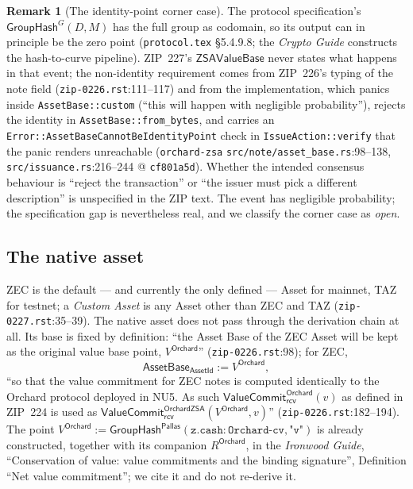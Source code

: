 \documentclass[11pt,a4paper]{article}
\theoremstyle{definition}
\newtheorem{remark}[theorem]{Remark}
\newcommand{\Pallas}{\ensuremath{\mathsf{Pallas}}}
\newcommand{\GroupHash}{\ensuremath{\mathsf{GroupHash}}}
\newcommand{\rcv}{\ensuremath{\mathsf{rcv}}}
\begin{document}
\begin{remark}[The identity-point corner case]\label{rem:zsa-identity-point}
The protocol specification's $\GroupHash^{G}(D, M)$ has the full group as
codomain, so its output can in principle be the zero point
(\texttt{protocol.tex} \S5.4.9.8; the \emph{Crypto Guide} constructs the
hash-to-curve pipeline). ZIP~227's $\mathsf{ZSAValueBase}$ never
states what happens in that event; the non-identity requirement comes from
ZIP~226's typing of the note field
(\texttt{zip-0226.rst}:111--117) and from the implementation, which panics
inside \texttt{AssetBase::custom} (``this will happen with negligible
probability''), rejects the identity in \texttt{AssetBase::from\_bytes},
and carries an \texttt{Error::AssetBaseCannotBeIdentityPoint} check in
\texttt{IssueAction::verify} that the panic renders unreachable
(\texttt{orchard-zsa} \texttt{src/note/\allowbreak asset\_base.rs}:98--138,
\texttt{src/issuance.rs}:216--244 @ \texttt{cf801a5d}). Whether the
intended consensus behaviour is ``reject the transaction'' or ``the issuer
must pick a different description'' is unspecified in the ZIP text. The
event has negligible probability; the specification gap is nevertheless
real, and we classify the corner case as \emph{open}.
\end{remark}

\subsection{The native asset}\label{sec:zsa-native-asset}

ZEC is the default --- and currently the only defined --- Asset for
mainnet, TAZ for testnet; a \emph{Custom Asset} is any Asset other than
ZEC and TAZ (\texttt{zip-0227.rst}:35--39). The native asset does not pass
through the derivation chain at all. Its base is fixed by definition:
``the Asset Base of the ZEC Asset will be kept as the original value base
point, $V^{\mathsf{Orchard}}$'' (\texttt{zip-0226.rst}:98); for ZEC,
\[
\mathsf{AssetBase}_{\mathsf{AssetId}} := V^{\mathsf{Orchard}},
\]
``so that the value commitment for ZEC notes is computed identically to
the Orchard protocol deployed in NU5. As such
$\mathsf{ValueCommit}^{\mathsf{Orchard}}_{\rcv}(v)$ as defined in ZIP~224
is used as
$\mathsf{ValueCommit}^{\mathsf{OrchardZSA}}_{\rcv}(V^{\mathsf{Orchard}},
v)$'' (\texttt{zip-0226.rst}:182--194). The point
$V^{\mathsf{Orchard}} :=
\GroupHash^{\Pallas}(\mathtt{z.cash:Orchard\text{-}cv}, \texttt{"v"})$ is
already constructed, together with its companion $R^{\mathsf{Orchard}}$,
in the \emph{Ironwood Guide}, ``Conservation of value: value commitments
and the binding signature'', Definition ``Net value commitment''; we cite
it and do not re-derive it.
\end{document}
